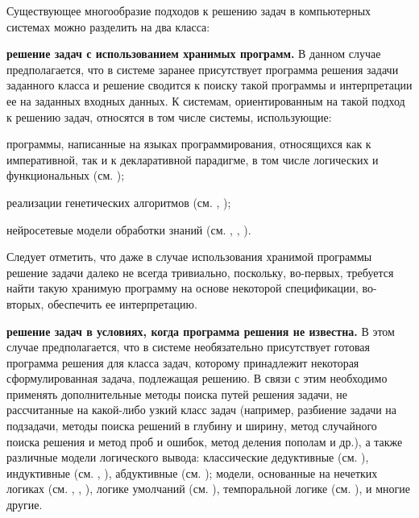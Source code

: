 Существующее многообразие подходов к решению задач в компьютерных системах можно разделить на два класса:
\begin{textitemize}
	\item \textbf{решение задач с использованием хранимых программ.} В данном случае предполагается, что в системе заранее присутствует программа решения задачи заданного класса и решение сводится к поиску такой программы и интерпретации ее на заданных входных данных. К системам, ориентированным на такой подход к решению задач, относятся в том числе системы, использующие:
	\begin{textitemize}
		\item программы, написанные на языках программирования, относящихся как к императивной, так и к декларативной парадигме, в том числе логических и функциональных (см. );
		\item реализации генетических алгоритмов (см. , );
		\item нейросетевые модели обработки знаний (см. ,  , ).
	\end{textitemize}	
	
	Следует отметить, что даже в случае использования хранимой программы решение задачи далеко не всегда тривиально, поскольку, во-первых, требуется найти такую хранимую программу на основе некоторой спецификации, во-вторых, обеспечить ее интерпретацию.
	
	\item \textbf{решение задач в условиях, когда программа решения не известна.} В этом случае предполагается, что в системе необязательно присутствует готовая программа решения для класса задач, которому принадлежит некоторая сформулированная задача, подлежащая решению. В связи с этим необходимо применять дополнительные методы поиска путей решения задачи, не рассчитанные на какой-либо узкий класс задач (например, разбиение задачи на подзадачи, методы поиска решений в глубину и ширину, метод случайного поиска решения и метод проб и ошибок, метод деления пополам и др.), а также различные модели логического вывода: классические дедуктивные (см. ), индуктивные (см. , ), абдуктивные (см. ); модели, основанные на нечетких логиках (см. , , ), логике умолчаний (см. ), темпоральной логике (см. ), и многие другие.
\end{textitemize}

